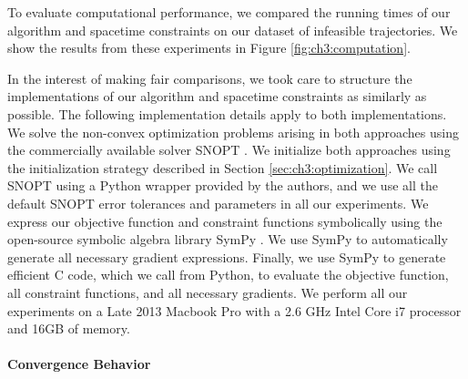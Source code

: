 To evaluate computational performance, we compared the running times of our algorithm and spacetime constraints on our dataset of infeasible trajectories.
We show the results from these experiments in Figure \ref{fig:ch3:computation}.

In the interest of making fair comparisons, we took care to structure the implementations of our algorithm and spacetime constraints as similarly as possible.
The following implementation details apply to both implementations.
We solve the non-convex optimization problems arising in both approaches using the commercially available solver SNOPT \cite{gill:2002}.
We initialize both approaches using the initialization strategy described in Section \ref{sec:ch3:optimization}.
We call SNOPT using a Python wrapper provided by the authors, and we use all the default SNOPT error tolerances and parameters in all our experiments.
We express our objective function and constraint functions symbolically using the open-source symbolic algebra library SymPy \cite{sympy:2014}.
We use SymPy to automatically generate all necessary gradient expressions. Finally, we use SymPy to generate efficient C code, which we call from Python, to evaluate the objective function, all constraint functions, and all necessary gradients.
We perform all our experiments on a Late 2013 Macbook Pro with a 2.6 GHz Intel Core i7 processor and 16GB of memory.

\paragraph{Convergence Behavior}

